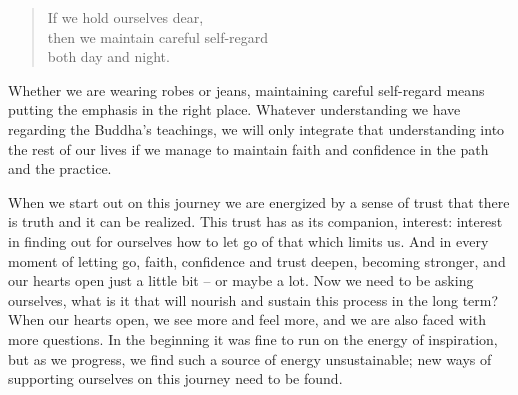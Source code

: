 \begin{quote}
  If we hold ourselves dear,\\
  then we maintain careful self-regard\\
  both day and night.
\end{quote}

Whether we are wearing robes or jeans, maintaining careful self-regard
means putting the emphasis in the right place. Whatever understanding we
have regarding the Buddha's teachings, we will only integrate that
understanding into the rest of our lives if we manage to maintain faith
and confidence in the path and the practice.

When we start out on this journey we are energized by a sense of trust
that there is truth and it can be realized. This trust has as its
companion, interest: interest in finding out for ourselves how to let go
of that which limits us. And in every moment of letting go, faith,
confidence and trust deepen, becoming stronger, and our hearts open just
a little bit -- or maybe a lot. Now we need to be asking ourselves, what
is it that will nourish and sustain this process in the long term? When
our hearts open, we see more and feel more, and we are also faced with
more questions. In the beginning it was fine to run on the energy of
inspiration, but as we progress, we find such a source of energy
unsustainable; new ways of supporting ourselves on this journey need to
be found.

